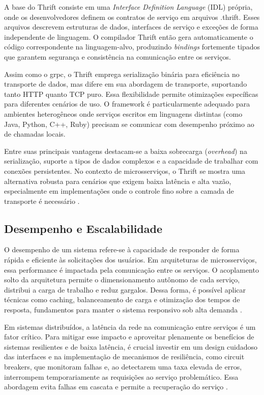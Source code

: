 A base do Thrift consiste em uma \textit{Interface Definition Language} (IDL) própria, onde os desenvolvedores definem os contratos de serviço em arquivos .thrift. Esses arquivos descrevem estruturas de dados, interfaces de serviço e exceções de forma independente de linguagem. O compilador Thrift então gera automaticamente o código correspondente na linguagem-alvo, produzindo \textit{bindings} fortemente tipados que garantem segurança e consistência na comunicação entre os serviços.

Assim como o \gls{grpc}, o Thrift emprega serialização binária para eficiência no transporte de dados, mas difere em sua abordagem de transporte, suportando tanto HTTP quanto TCP puro. Essa flexibilidade permite otimizações específicas para diferentes cenários de uso. O framework é particularmente adequado para ambientes heterogêneos onde serviços escritos em linguagens distintas (como Java, Python, C++, Ruby) precisam se comunicar com desempenho próximo ao de chamadas locais.

Entre suas principais vantagens destacam-se a baixa sobrecarga (\textit{overhead}) na serialização, suporte a tipos de dados complexos e a capacidade de trabalhar com conexões persistentes. No contexto de microsserviços, o Thrift se mostra uma alternativa robusta para cenários que exigem baixa latência e alta vazão, especialmente em implementações onde o controle fino sobre a camada de transporte é necessário \cite{apache_apache_nodate}.

\subsection{Desempenho e Escalabilidade}

O desempenho de um sistema refere-se à capacidade de responder de forma rápida e eficiente às solicitações dos usuários. Em arquiteturas de microsserviços, essa performance é impactada pela comunicação entre os serviços. O acoplamento solto da arquitetura permite o dimensionamento autônomo de cada serviço, distribui a carga de trabalho e reduz gargalos. Dessa forma, é possível aplicar técnicas como caching, balanceamento de carga e otimização dos tempos de resposta, fundamentos para manter o sistema responsivo sob alta demanda \cite{newman_building_2022}.

Em sistemas distribuídos, a latência da rede na comunicação entre serviços é um fator crítico. Para mitigar esse impacto e aproveitar plenamente os benefícios de sistemas resilientes e de baixa latência, é crucial investir em um design cuidadoso das interfaces e na implementação de mecanismos de resiliência, como circuit breakers, que monitoram falhas e, ao detectarem uma taxa elevada de erros, interrompem temporariamente as requisições ao serviço problemático. Essa abordagem evita falhas em cascata e permite a recuperação do serviço \cite[p. 131]{kleppmann_designing_2017}. 

